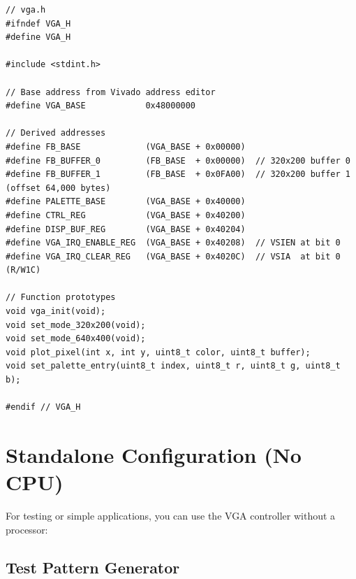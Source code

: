 \documentclass[11pt,letterpaper]{report}
\begin{document}
\begin{lstlisting}[style=c,caption={MicroBlaze Software Header}]
// vga.h
#ifndef VGA_H
#define VGA_H

#include <stdint.h>

// Base address from Vivado address editor
#define VGA_BASE            0x48000000

// Derived addresses
#define FB_BASE             (VGA_BASE + 0x00000)
#define FB_BUFFER_0         (FB_BASE  + 0x00000)  // 320x200 buffer 0
#define FB_BUFFER_1         (FB_BASE  + 0x0FA00)  // 320x200 buffer 1 (offset 64,000 bytes)
#define PALETTE_BASE        (VGA_BASE + 0x40000)
#define CTRL_REG            (VGA_BASE + 0x40200)
#define DISP_BUF_REG        (VGA_BASE + 0x40204)
#define VGA_IRQ_ENABLE_REG  (VGA_BASE + 0x40208)  // VSIEN at bit 0
#define VGA_IRQ_CLEAR_REG   (VGA_BASE + 0x4020C)  // VSIA  at bit 0 (R/W1C)

// Function prototypes
void vga_init(void);
void set_mode_320x200(void);
void set_mode_640x400(void);
void plot_pixel(int x, int y, uint8_t color, uint8_t buffer);
void set_palette_entry(uint8_t index, uint8_t r, uint8_t g, uint8_t b);

#endif // VGA_H
\end{lstlisting}

\section{Standalone Configuration (No CPU)}

For testing or simple applications, you can use the VGA controller without a processor:

\subsection{Test Pattern Generator}
\end{document}
